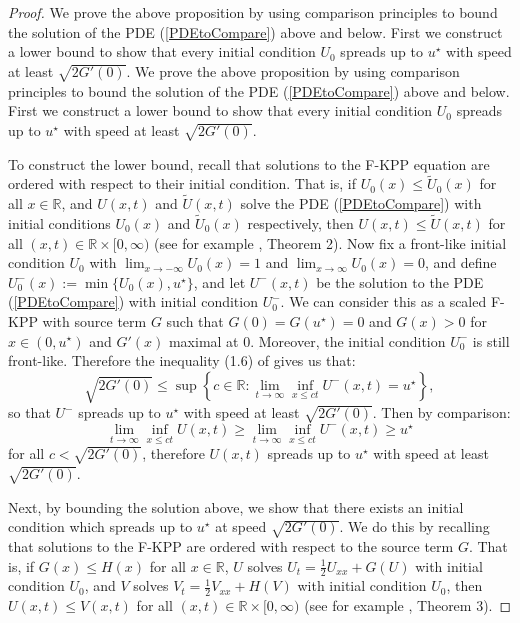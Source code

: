 \documentclass{article}
\newcommand{\B}[1]{\mathbb{#1}}
\begin{document}
\begin{proof}
    We prove the above proposition by using comparison principles to bound the solution of the PDE (\ref{PDEtoCompare}) above and below. First we construct a lower bound to show that every initial condition $U_0$ spreads up to $u^\star$ with speed at least $\sqrt{2G'(0)}$. 
    We prove the above proposition by using comparison principles to bound the solution of the PDE (\ref{PDEtoCompare}) above and below. First we construct a lower bound to show that every initial condition $U_0$ spreads up to $u^\star$ with speed at least $\sqrt{2G'(0)}$. 
    
    To construct the lower bound, recall that solutions to the F-KPP equation are ordered with respect to their initial condition. That is, if $U_0(x) \leq \tilde{U}_0(x)$ for all $x\in \B{R}$, and $U(x,t)$ and $\tilde{U}(x,t)$ solve the PDE (\ref{PDEtoCompare}) with initial conditions $U_0(x)$ and $\tilde{U}_0(x)$ respectively, then $U(x,t)\leq \tilde{U}(x,t)$ for all $(x,t)\in \B{R}\times [0,\infty)$ (see for example \cite{kpp}, Theorem 2). Now fix a front-like initial condition $U_0$ with $\lim_{x\to-\infty}U_0(x)=1$ and $\lim_{x\to\infty}U_0(x)=0$, and define $U^-_0(x):=\min\{U_0(x),u^\star\}$, and let $U^-(x,t)$ be the solution to the PDE (\ref{PDEtoCompare}) with initial condition $U^-_0$. We can consider this as a scaled F-KPP with source term $G$ such that $G(0)=G(u^\star)=0$ and $G(x)>0$ for $x\in (0,u^\star)$ and $G'(x)$ maximal at $0$. %
    Moreover, the initial condition $U^-_0$ is still front-like. Therefore the inequality (1.6) of \cite{hamelNadin} gives us that:
    $$\sqrt{2G'(0)} \leq \sup\left\{c\in \B{R}: \lim_{t\to\infty}\inf_{x\leq ct}U^-(x,t)=u^\star\right\},$$
    so that $U^-$ spreads up to $u^\star$ with speed at least $\sqrt{2G'(0)}$. Then by comparison:
    $$\lim_{t\to\infty}\inf_{x\leq ct}U(x,t)\geq \lim_{t\to\infty}\inf_{x\leq ct}U^-(x,t)\geq u^\star$$ for all $c<\sqrt{2G'(0)}$, therefore $U(x,t)$ spreads up to $u^\star$ with speed at least $\sqrt{2G'(0)}$. 
    
    Next, by bounding the solution above, we show that there exists an initial condition which spreads up to $u^\star$ at speed $\sqrt{2G'(0)}$. We do this by recalling that solutions to the F-KPP are ordered with respect to the source term $G$. That is, if $G(x)\leq H(x)$ for all $x\in \B{R}$, $U$ solves $U_t = \frac12 U_{xx}+ G(U)$ with initial condition $U_0$, and $V$ solves $V_t = \frac12 V_{xx} + H(V)$ with initial condition $U_0$, then $U(x,t)\leq V(x,t)$ for all $(x,t)\in \B{R}\times [0,\infty)$ (see for example \cite{kpp}, Theorem 3). 
    

\end{proof}
\end{document}
